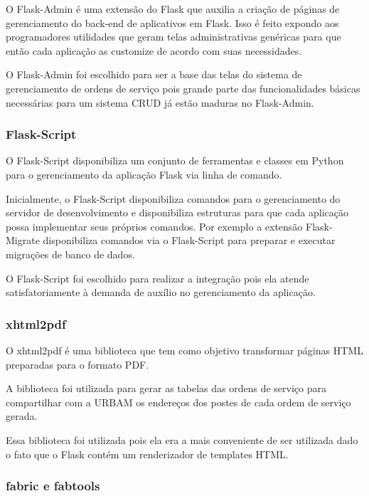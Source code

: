 \documentclass[
	article,			%
	11pt,				%
	oneside,			%
	a4paper,			%
	english,			%
	brazil,				%
	sumario=tradicional
	]{abntex2}
\begin{document}
O Flask-Admin é uma extensão do Flask que auxilia a criação de páginas de gerenciamento do back-end de aplicativos em Flask.
Isso é feito expondo aos programadores utilidades que geram telas administrativas genéricas para que então cada aplicação as customize de acordo com suas necessidades. \cite{flaskadmin}

O Flask-Admin foi escolhido para ser a base das telas do sistema de gerenciamento de ordens de serviço pois grande parte das funcionalidades básicas necessárias para um sistema CRUD já estão maduras no Flask-Admin.

\subsubsection{Flask-Script}

O Flask-Script disponibiliza um conjunto de ferramentas e classes em Python para o gerenciamento da aplicação Flask via linha de comando.

Inicialmente, o Flask-Script disponibiliza comandos para o gerenciamento do servidor de desenvolvimento e disponibiliza estruturas para que cada aplicação possa implementar seus próprios comandos. \cite{flaskscript}
Por exemplo a extensão Flask-Migrate disponibiliza comandos via o Flask-Script para preparar e executar migrações de banco de dados.

O Flask-Script foi escolhido para realizar a integração pois ela atende satisfatoriamente à demanda de auxílio no gerenciamento da aplicação.

\subsubsection{xhtml2pdf}

O xhtml2pdf é uma biblioteca que tem como objetivo transformar páginas HTML preparadas para o formato PDF.\cite{xhtml2pdf}

A biblioteca foi utilizada para gerar as tabelas das ordens de serviço para compartilhar com a URBAM os endereços dos postes de cada ordem de serviço gerada.

Essa biblioteca foi utilizada pois ela era a mais conveniente de ser utilizada dado o fato que o Flask contém um renderizador de templates HTML.

\subsubsection{fabric e fabtools}
\end{document}
